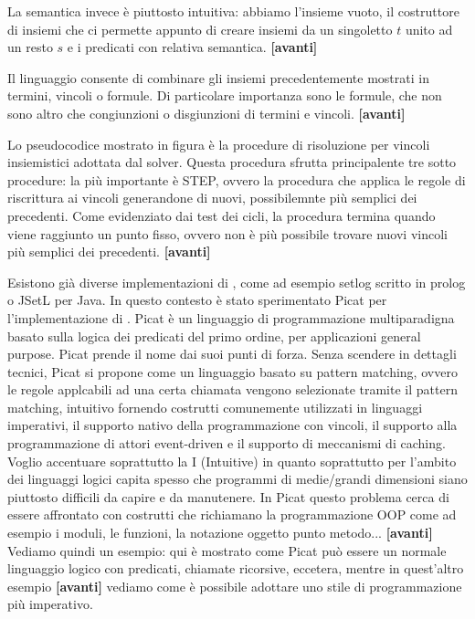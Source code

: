 \documentclass[11pt]{article}
\newcommand*{\nextslide}{\textbf{[avanti]}}
\begin{document}
La semantica invece è piuttosto intuitiva: abbiamo l'insieme vuoto, il
costruttore di insiemi che ci permette appunto di creare insiemi da un
singoletto $t$ unito ad un resto $s$ e i predicati con relativa
semantica. \nextslide{}

Il linguaggio consente di combinare gli insiemi precedentemente
mostrati in termini, vincoli o formule. Di particolare importanza sono
le formule, che non sono altro che congiunzioni o disgiunzioni di
termini e vincoli. \nextslide{}

Lo pseudocodice mostrato in figura è la procedure di risoluzione per
vincoli insiemistici adottata dal solver. Questa procedura sfrutta
principalente tre sotto procedure: la più importante è STEP, ovvero la
procedura che applica le regole di riscrittura ai vincoli generandone
di nuovi, possibilemnte più semplici dei precedenti.  Come evidenziato
dai test dei cicli, la procedura termina quando viene raggiunto un
punto fisso, ovvero non è più possibile trovare nuovi vincoli più
semplici dei precedenti. \nextslide{}

Esistono già diverse implementazioni di \lset{}, come ad esempio
setlog scritto in prolog o JSetL per Java. In questo contesto è stato
sperimentato Picat per l'implementazione di \lset{}. Picat è un
linguaggio di programmazione multiparadigna basato sulla logica dei
predicati del primo ordine, per applicazioni general purpose. Picat
prende il nome dai suoi punti di forza. Senza scendere in dettagli
tecnici, Picat si propone come un linguaggio basato su pattern
matching, ovvero le regole applcabili ad una certa chiamata vengono
selezionate tramite il pattern matching, intuitivo fornendo costrutti
comunemente utilizzati in linguaggi imperativi, il supporto nativo
della programmazione con vincoli, il supporto alla programmazione di
attori event-driven e il supporto di meccanismi di caching.  Voglio
accentuare soprattutto la I (Intuitive) in quanto soprattutto per
l'ambito dei linguaggi logici capita spesso che programmi di
medie/grandi dimensioni siano piuttosto difficili da capire e da
manutenere. In Picat questo problema cerca di essere affrontato con
costrutti che richiamano la programmazione OOP come ad esempio i
moduli, le funzioni, la notazione oggetto punto metodo... \nextslide{}
Vediamo quindi un esempio: qui è mostrato come Picat può essere un
normale linguaggio logico con predicati, chiamate ricorsive, eccetera,
mentre in quest'altro esempio \nextslide{} vediamo come è possibile
adottare uno stile di programmazione più imperativo.
\end{document}
